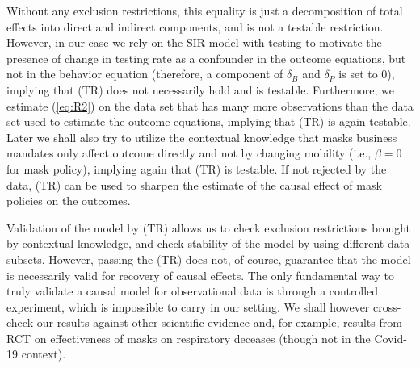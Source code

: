 \documentclass[11pt,reqno,letter]{amsart}
\theoremstyle{definition}
\begin{document}
Without any exclusion restrictions, this equality is just a decomposition of total effects
into direct and indirect components, and is not a testable restriction. However, in our case we rely on the SIR
model with testing to motivate the presence of change in testing rate as a confounder in the outcome
equations, but not in the behavior equation (therefore, a component of $\delta_B$ and $\delta_P$ is set to 0), implying that (TR) does not necessarily hold and is testable. Furthermore, we estimate (\ref{eq:R2}) on the data set that has many more observations than the data set used to estimate the outcome equations, implying that (TR) is again testable.  Later we  shall also try to
utilize the contextual knowledge that masks business mandates only affect outcome directly and not by changing mobility (i.e., $\beta=0$ for mask policy), implying again that (TR) is testable. If not rejected by the data, (TR) can be used to sharpen the estimate of the causal effect of mask policies on the outcomes.

Validation of the model by (TR) allows us to check exclusion restrictions brought by contextual knowledge,
and check stability of the model by using different data subsets.  However, passing the (TR) does
not, of course, guarantee that the model is necessarily valid for recovery of causal effects. The only fundamental way to truly validate a causal model for observational data is through a controlled experiment, which is impossible to carry  in our setting. We shall however cross-check our results against other scientific evidence and, for example, results from RCT on effectiveness of masks on respiratory deceases (though not in the Covid-19 context).
\end{document}
